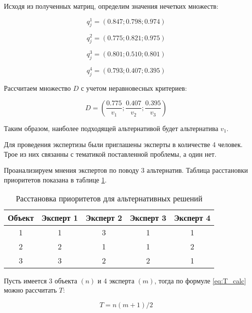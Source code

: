 Исходя из полученных матриц, определим значения нечетких множеств:

\begin{equation}
    q^1_j=(0.847;0.798;0.974) 
\end{equation}

\begin{equation}
    q^2_j=(0.775;0.821;0.975)
\end{equation}

\begin{equation}
    q^3_j=(0.801;0.510;0.801)
\end{equation}

\begin{equation}
    q^4_j=(0.793;0.407;0.395)
\end{equation}

Рассчитаем множество $D$ с учетом неравновесных критериев:

\begin{equation}
    D=(\frac{0.775}{v_1};\frac{0.407}{v_2};\frac{0.395}{v_3})
\end{equation}

Таким образом, наиболее подходящей альтернативой будет альтернатива $v_1$.

Для проведения экспертизы были приглашены эксперты в количестве 4 человек. Трое из них связанны с тематикой поставленной проблемы, а один нет.

Проанализируем мнения экспертов по поводу 3 альтернатив. Таблица расстановки приоритетов показана в таблице \ref{table:experts_priority}. 

\begin{table}[H]
    \centering
    \caption{Расстановка приоритетов для альтернативных решений}\label{table:experts_priority}
    \begin{tabular}{|c|c|c|c|c|}
    \hline Объект & Эксперт 1 & Эксперт 2 & Эксперт 3 & Эксперт 4 \\
    \hline 1 & 1 & 3 & 1 & 1  \\
    \hline 2 & 2 & 1 & 1 &  2 \\
    \hline 3 & 3 & 2 & 2 & 1 \\
    \hline
    \end{tabular}
\end{table}

Пусть имеется 3 объекта $(n)$ и 4 эксперта $(m)$, тогда по формуле \ref{eq:T_calc} можно рассчитать $T$:

\begin{equation}
    \label{eq:T_calc}
    T=n(m+1)/2
\end{equation}

